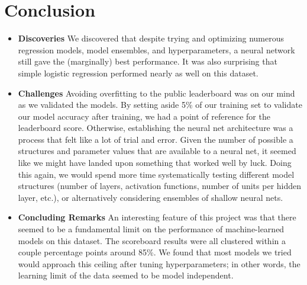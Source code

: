 \section{Conclusion}
\medskip
\begin{itemize}
	
	\item \textbf{Discoveries} 
	We discovered that despite trying and optimizing numerous regression models, model ensembles, and hyperparameters, a neural network still gave the (marginally) best performance. It was also surprising that simple logistic regression performed nearly as well on this dataset. 
	
	\item \textbf{Challenges} 
	Avoiding overfitting to the public leaderboard was on our mind as we validated the models. By setting aside 5\% of our training set to validate our model accuracy after training, we had a point of reference for the leaderboard score. Otherwise, establishing the neural net architecture was a process that felt like a lot of trial and error. Given the number of possible a structures and parameter values that are available to a neural net, it seemed like we might have landed upon something that worked well by luck. Doing this again, we would spend more time systematically testing different model structures (number of layers, activation functions, number of units per hidden layer, etc.), or alternatively considering ensembles of shallow neural nets. 
	
	\item \textbf{Concluding Remarks} 
	An interesting feature of this project was that there seemed to be a fundamental limit on the performance of machine-learned models on this dataset. The scoreboard results were all clustered within a couple percentage points around 85\%. We found that most models we tried would approach this ceiling after tuning hyperparameters; in other words, the learning limit of the data seemed to be model independent. 
	
\end{itemize}






\medskip




\begin{comment}
	
	
\clearpage
\section*{Appendix: Python Code}

\subsection*{Problem 2}


\end{comment}

